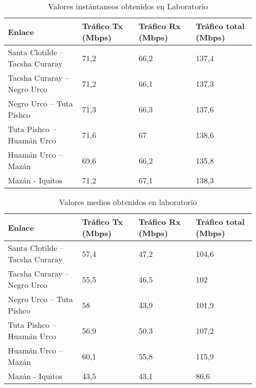 \begin{table}[H]
	\begin{center}
		\begin{tabular}{|l|l|l|l|}
			\hline
			Enlace & Tráfico Tx (Mbps) & Tráfico Rx (Mbps) & Tráfico total (Mbps)\\
			\hline 
			Santa Clotilde – Tacsha Curaray & 71,2 & 66,2 & 137,4\\ \hline
			Tacsha Curaray – Negro Urco & 71,2 & 66,1 & 137,3 \\ \hline
			Negro Urco – Tuta Pishco & 71,3 & 66,3 & 137,6 \\ \hline
			Tuta Pishco – Huamán Urco & 71,6 & 67 & 138,6 \\ \hline
			Huamán Urco – Mazán & 69,6 & 66,2 & 135,8 \\ \hline
			Mazán - Iquitos & 71,2 & 67,1 & 138,3 \\ \hline
		\end{tabular}
	\end{center}
	\caption{Valores instántaneos obtenidos en Laboratorio}
	\label{table:medidasInstLabNapo}
\end{table}

\begin{table}[H]
	\begin{center}
		\begin{tabular}{|l|l|l|l|}
			\hline
			Enlace & Tráfico Tx (Mbps) & Tráfico Rx (Mbps) & Tráfico total (Mbps)\\
			\hline 
			Santa Clotilde – Tacsha Curaray & 57,4 & 47,2 & 104,6 \\ \hline
			Tacsha Curaray – Negro Urco & 55,5 & 46,5 & 102 \\ \hline
			Negro Urco – Tuta Pishco & 58 & 43,9 & 101,9 \\ \hline
			Tuta Pishco – Huamán Urco & 56,9 & 50,3 & 107,2 \\ \hline
			Huamán Urco – Mazán & 60,1 & 55,8 & 115,9 \\ \hline
			Mazán - Iquitos & 43,5 & 43,1 & 86,6 \\ \hline
		\end{tabular}
	\end{center}
	\caption{Valores medios obtenidos en laboratorio}
	\label{table:medidasMediasLabNapo}
\end{table}

